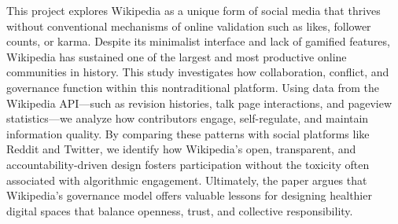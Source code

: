 
This project explores Wikipedia as a unique form of social media that thrives without conventional mechanisms of online validation such as likes, follower counts, or karma. Despite its minimalist interface and lack of gamified features, Wikipedia has sustained one of the largest and most productive online communities in history. This study investigates how collaboration, conflict, and governance function within this nontraditional platform. Using data from the Wikipedia API—such as revision histories, talk page interactions, and pageview statistics—we analyze how contributors engage, self-regulate, and maintain information quality. By comparing these patterns with social platforms like Reddit and Twitter, we identify how Wikipedia’s open, transparent, and accountability-driven design fosters participation without the toxicity often associated with algorithmic engagement. Ultimately, the paper argues that Wikipedia’s governance model offers valuable lessons for designing healthier digital spaces that balance openness, trust, and collective responsibility.


